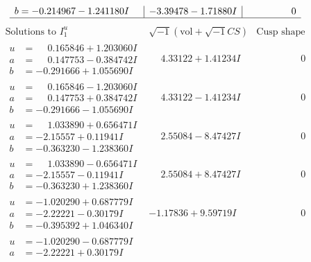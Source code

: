 \documentclass[1p]{elsarticle_modified}
\theoremstyle{definition}
\newcommand{\I}{\sqrt{-1}}
\begin{document}
$$\begin{array}{c|c|c}
\begin{aligned}
b &= -0.214967 - 1.241180 I\end{aligned}
 & -3.39478 - 1.71880 I & \phantom{-0.000000 } 0\\
 \hline 
 \end{array}$$\newpage$$\begin{array}{c|c|c}  
\text{Solutions to }I^u_{1}& \I (\text{vol} + \sqrt{-1}CS) & \text{Cusp shape}\\
 \hline 
\begin{aligned}
u &= \phantom{-}0.165846 + 1.203060 I \\
a &= \phantom{-}0.147753 - 0.384742 I \\
b &= -0.291666 + 1.055690 I\end{aligned}
 & \phantom{-}4.33122 + 1.41234 I & \phantom{-0.000000 } 0 \\ \hline\begin{aligned}
u &= \phantom{-}0.165846 - 1.203060 I \\
a &= \phantom{-}0.147753 + 0.384742 I \\
b &= -0.291666 - 1.055690 I\end{aligned}
 & \phantom{-}4.33122 - 1.41234 I & \phantom{-0.000000 } 0 \\ \hline\begin{aligned}
u &= \phantom{-}1.033890 + 0.656471 I \\
a &= -2.15557 + 0.11941 I \\
b &= -0.363230 - 1.238360 I\end{aligned}
 & \phantom{-}2.55084 - 8.47427 I & \phantom{-0.000000 } 0 \\ \hline\begin{aligned}
u &= \phantom{-}1.033890 - 0.656471 I \\
a &= -2.15557 - 0.11941 I \\
b &= -0.363230 + 1.238360 I\end{aligned}
 & \phantom{-}2.55084 + 8.47427 I & \phantom{-0.000000 } 0 \\ \hline\begin{aligned}
u &= -1.020290 + 0.687779 I \\
a &= -2.22221 - 0.30179 I \\
b &= -0.395392 + 1.046340 I\end{aligned}
 & -1.17836 + 9.59719 I & \phantom{-0.000000 } 0 \\ \hline\begin{aligned}
u &= -1.020290 - 0.687779 I \\
a &= -2.22221 + 0.30179 I \\

\end{aligned}
\end{array}$$
\end{document}
